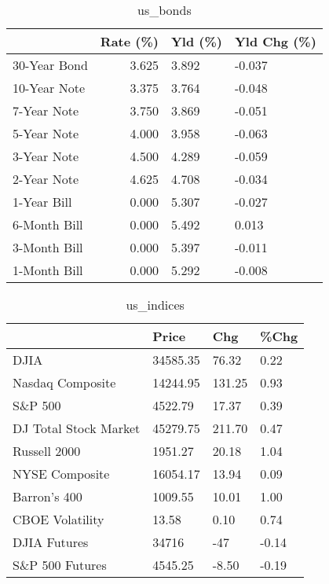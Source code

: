 \documentclass{article}%
\begin{document}
%


\begin{table}[htbp]%
\caption{us\_bonds}%
\centering%
\begin{adjustbox}{width=1\textwidth}%
\begin{tabular}{lrll}
\toprule
             &  Rate (\%) & Yld (\%) & Yld Chg (\%) \\
\midrule
30-Year Bond &     3.625 &   3.892 &      -0.037 \\
10-Year Note &     3.375 &   3.764 &      -0.048 \\
 7-Year Note &     3.750 &   3.869 &      -0.051 \\
 5-Year Note &     4.000 &   3.958 &      -0.063 \\
 3-Year Note &     4.500 &   4.289 &      -0.059 \\
 2-Year Note &     4.625 &   4.708 &      -0.034 \\
 1-Year Bill &     0.000 &   5.307 &      -0.027 \\
6-Month Bill &     0.000 &   5.492 &       0.013 \\
3-Month Bill &     0.000 &   5.397 &      -0.011 \\
1-Month Bill &     0.000 &   5.292 &      -0.008 \\
\bottomrule
\end{tabular}
%
\end{adjustbox}%
\end{table}

%


\begin{table}[htbp]%
\caption{us\_indices}%
\centering%
\begin{adjustbox}{width=1\textwidth}%
\begin{tabular}{llll}
\toprule
                      &    Price &    Chg &  \%Chg \\
\midrule
                 DJIA & 34585.35 &  76.32 &  0.22 \\
     Nasdaq Composite & 14244.95 & 131.25 &  0.93 \\
              S\&P 500 &  4522.79 &  17.37 &  0.39 \\
DJ Total Stock Market & 45279.75 & 211.70 &  0.47 \\
         Russell 2000 &  1951.27 &  20.18 &  1.04 \\
       NYSE Composite & 16054.17 &  13.94 &  0.09 \\
         Barron's 400 &  1009.55 &  10.01 &  1.00 \\
      CBOE Volatility &    13.58 &   0.10 &  0.74 \\
         DJIA Futures &    34716 &    -47 & -0.14 \\
      S\&P 500 Futures &  4545.25 &  -8.50 & -0.19 \\
\bottomrule
\end{tabular}
%
\end{adjustbox}%
\end{table}
\end{document}
